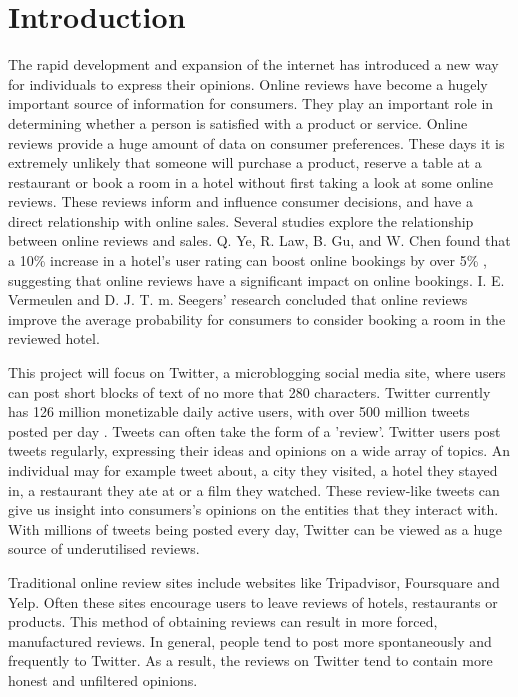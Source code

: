\chapter{Introduction}

The rapid development and expansion of the internet has introduced a new way for individuals to express their opinions. Online reviews have become a hugely important source of information for consumers. They play an important role in determining whether a person is satisfied with a product or service. Online reviews provide a huge amount of data on consumer preferences. These days it is extremely unlikely that someone will purchase a product, reserve a table at a restaurant or book a room in a hotel without first taking a look at some online reviews. These reviews inform and influence consumer decisions, and have a direct relationship with online sales. Several studies explore the relationship between online reviews and sales. Q. Ye, R. Law, B. Gu, and W. Chen found that a 10\% increase in a hotel's user rating can boost online bookings by over 5\% \cite{HotelSales2011}, suggesting that online reviews have a significant impact on online bookings. I. E. Vermeulen and D. J. T. m. Seegers' \cite{Vermeulen2009} research concluded that online reviews improve the average probability for consumers to consider booking a room in the reviewed hotel. 

This project will focus on Twitter, a microblogging social media site, where users can post short blocks of text of no more that 280 characters. Twitter currently has 126 million monetizable daily active users, with over 500 million tweets posted per day \cite{Twitter2019}. Tweets can often take the form of a 'review'. Twitter users post tweets regularly, expressing their ideas and opinions on a wide array of topics. An individual may for example tweet about, a city they visited, a hotel they stayed in, a restaurant they ate at or a film they watched. These review-like tweets can give us insight into consumers’s opinions on the entities that they interact with. With millions of tweets being posted every day, Twitter can be viewed as a huge source of underutilised reviews.

Traditional online review sites include websites like Tripadvisor, Foursquare and Yelp. Often these sites encourage users to leave reviews of hotels, restaurants or products. This method of obtaining reviews can result in more forced, manufactured reviews. In general, people tend to post more spontaneously and frequently to Twitter. As a result, the reviews on Twitter tend to contain more honest and unfiltered opinions. 

